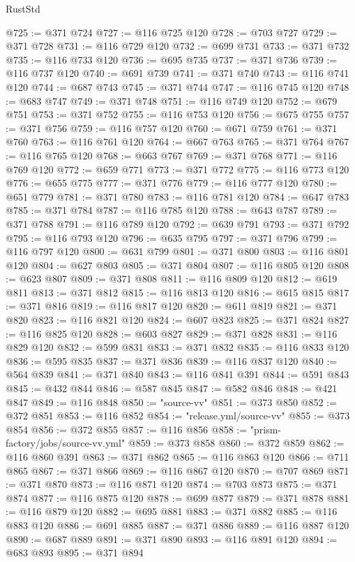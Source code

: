 \begin{lexlean}{RustStd}
\begin{coremodule}
@725 := @371 @724
@727 := @116 @725 @120
@728 := @703 @727
@729 := @371 @728
@731 := @116 @729 @120
@732 := @699 @731
@733 := @371 @732
@735 := @116 @733 @120
@736 := @695 @735
@737 := @371 @736
@739 := @116 @737 @120
@740 := @691 @739
@741 := @371 @740
@743 := @116 @741 @120
@744 := @687 @743
@745 := @371 @744
@747 := @116 @745 @120
@748 := @683 @747
@749 := @371 @748
@751 := @116 @749 @120
@752 := @679 @751
@753 := @371 @752
@755 := @116 @753 @120
@756 := @675 @755
@757 := @371 @756
@759 := @116 @757 @120
@760 := @671 @759
@761 := @371 @760
@763 := @116 @761 @120
@764 := @667 @763
@765 := @371 @764
@767 := @116 @765 @120
@768 := @663 @767
@769 := @371 @768
@771 := @116 @769 @120
@772 := @659 @771
@773 := @371 @772
@775 := @116 @773 @120
@776 := @655 @775
@777 := @371 @776
@779 := @116 @777 @120
@780 := @651 @779
@781 := @371 @780
@783 := @116 @781 @120
@784 := @647 @783
@785 := @371 @784
@787 := @116 @785 @120
@788 := @643 @787
@789 := @371 @788
@791 := @116 @789 @120
@792 := @639 @791
@793 := @371 @792
@795 := @116 @793 @120
@796 := @635 @795
@797 := @371 @796
@799 := @116 @797 @120
@800 := @631 @799
@801 := @371 @800
@803 := @116 @801 @120
@804 := @627 @803
@805 := @371 @804
@807 := @116 @805 @120
@808 := @623 @807
@809 := @371 @808
@811 := @116 @809 @120
@812 := @619 @811
@813 := @371 @812
@815 := @116 @813 @120
@816 := @615 @815
@817 := @371 @816
@819 := @116 @817 @120
@820 := @611 @819
@821 := @371 @820
@823 := @116 @821 @120
@824 := @607 @823
@825 := @371 @824
@827 := @116 @825 @120
@828 := @603 @827
@829 := @371 @828
@831 := @116 @829 @120
@832 := @599 @831
@833 := @371 @832
@835 := @116 @833 @120
@836 := @595 @835
@837 := @371 @836
@839 := @116 @837 @120
@840 := @564 @839
@841 := @371 @840
@843 := @116 @841 @391
@844 := @591 @843
@845 := @432 @844
@846 := @587 @845
@847 := @582 @846
@848 := @421 @847
@849 := @116 @848
@850 := "source-vv"
@851 := @373 @850
@852 := @372 @851
@853 := @116 @852
@854 := "release.yml/source-vv"
@855 := @373 @854
@856 := @372 @855
@857 := @116 @856
@858 := "prism-factory/jobs/source-vv.yml"
@859 := @373 @858
@860 := @372 @859
@862 := @116 @860 @391
@863 := @371 @862
@865 := @116 @863 @120
@866 := @711 @865
@867 := @371 @866
@869 := @116 @867 @120
@870 := @707 @869
@871 := @371 @870
@873 := @116 @871 @120
@874 := @703 @873
@875 := @371 @874
@877 := @116 @875 @120
@878 := @699 @877
@879 := @371 @878
@881 := @116 @879 @120
@882 := @695 @881
@883 := @371 @882
@885 := @116 @883 @120
@886 := @691 @885
@887 := @371 @886
@889 := @116 @887 @120
@890 := @687 @889
@891 := @371 @890
@893 := @116 @891 @120
@894 := @683 @893
@895 := @371 @894

\end{coremodule}
\end{lexlean}
